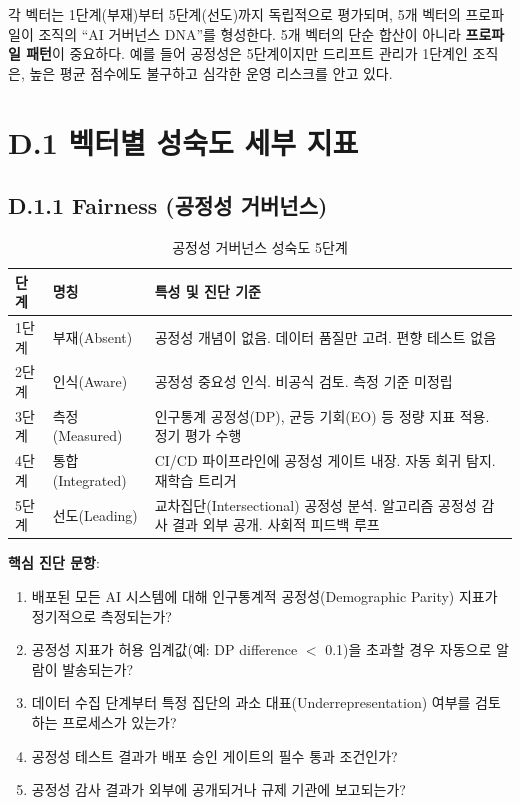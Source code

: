 각 벡터는 1단계(부재)부터 5단계(선도)까지 독립적으로 평가되며, 5개 벡터의 프로파일이 조직의 ``AI 거버넌스 DNA''를 형성한다. 5개 벡터의 단순 합산이 아니라 \textbf{프로파일 패턴}이 중요하다. 예를 들어 공정성은 5단계이지만 드리프트 관리가 1단계인 조직은, 높은 평균 점수에도 불구하고 심각한 운영 리스크를 안고 있다.

\section*{D.1 벡터별 성숙도 세부 지표}

\subsection*{D.1.1 Fairness (공정성 거버넌스)}

\begin{table}[htbp]
\centering
\caption{공정성 거버넌스 성숙도 5단계}
\label{tab:fairness_maturity}
\begin{tabularx}{\textwidth}{|l|l|X|}
\hline
\textbf{단계} & \textbf{명칭} & \textbf{특성 및 진단 기준} \\ \hline
1단계 & 부재(Absent) & 공정성 개념이 없음. 데이터 품질만 고려. 편향 테스트 없음 \\ \hline
2단계 & 인식(Aware) & 공정성 중요성 인식. 비공식 검토. 측정 기준 미정립 \\ \hline
3단계 & 측정(Measured) & 인구통계 공정성(DP), 균등 기회(EO) 등 정량 지표 적용. 정기 평가 수행 \\ \hline
4단계 & 통합(Integrated) & CI/CD 파이프라인에 공정성 게이트 내장. 자동 회귀 탐지. 재학습 트리거 \\ \hline
5단계 & 선도(Leading) & 교차집단(Intersectional) 공정성 분석. 알고리즘 공정성 감사 결과 외부 공개. 사회적 피드백 루프 \\ \hline
\end{tabularx}
\end{table}

\textbf{핵심 진단 문항}:
\begin{enumerate}
    \item 배포된 모든 AI 시스템에 대해 인구통계적 공정성(Demographic Parity) 지표가 정기적으로 측정되는가?
    \item 공정성 지표가 허용 임계값(예: DP difference $<$ 0.1)을 초과할 경우 자동으로 알람이 발송되는가?
    \item 데이터 수집 단계부터 특정 집단의 과소 대표(Underrepresentation) 여부를 검토하는 프로세스가 있는가?
    \item 공정성 테스트 결과가 배포 승인 게이트의 필수 통과 조건인가?
    \item 공정성 감사 결과가 외부에 공개되거나 규제 기관에 보고되는가?
\end{enumerate}

